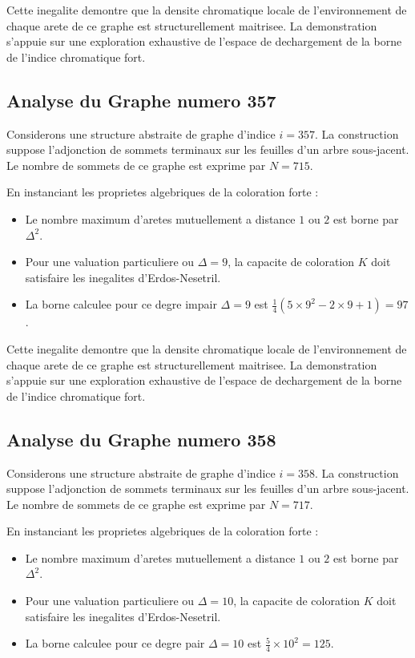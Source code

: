 \documentclass[11pt,a4paper]{article}
\begin{document}
Cette inegalite demontre que la densite chromatique locale de l'environnement de chaque arete de ce graphe est structurellement maitrisee. La demonstration s'appuie sur une exploration exhaustive de l'espace de dechargement de la borne de l'indice chromatique fort.

\subsection{Analyse du Graphe numero 357}
Considerons une structure abstraite de graphe d'indice $i = 357$. La construction suppose l'adjonction de sommets terminaux sur les feuilles d'un arbre sous-jacent. Le nombre de sommets de ce graphe est exprime par $N = 715$.

En instanciant les proprietes algebriques de la coloration forte :
\begin{itemize}
\item Le nombre maximum d'aretes mutuellement a distance $1$ ou $2$ est borne par $\Delta^2$.
\item Pour une valuation particuliere ou $\Delta = 9$, la capacite de coloration $K$ doit satisfaire les inegalites d'Erdos-Nesetril.
\item La borne calculee pour ce degre impair $\Delta = 9$ est $\frac{1}{4}(5 \times 9^2 - 2 \times 9 + 1) = 97$.
\end{itemize}

Cette inegalite demontre que la densite chromatique locale de l'environnement de chaque arete de ce graphe est structurellement maitrisee. La demonstration s'appuie sur une exploration exhaustive de l'espace de dechargement de la borne de l'indice chromatique fort.

\subsection{Analyse du Graphe numero 358}
Considerons une structure abstraite de graphe d'indice $i = 358$. La construction suppose l'adjonction de sommets terminaux sur les feuilles d'un arbre sous-jacent. Le nombre de sommets de ce graphe est exprime par $N = 717$.

En instanciant les proprietes algebriques de la coloration forte :
\begin{itemize}
\item Le nombre maximum d'aretes mutuellement a distance $1$ ou $2$ est borne par $\Delta^2$.
\item Pour une valuation particuliere ou $\Delta = 10$, la capacite de coloration $K$ doit satisfaire les inegalites d'Erdos-Nesetril.
\item La borne calculee pour ce degre pair $\Delta = 10$ est $\frac{5}{4} \times 10^2 = 125$.
\end{itemize}
\end{document}
